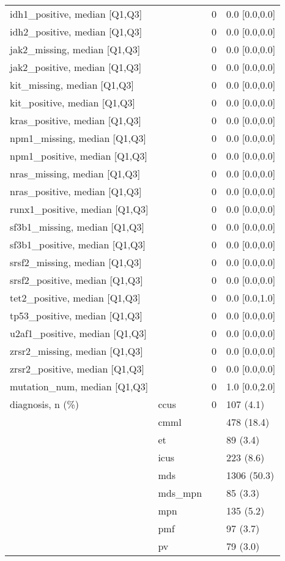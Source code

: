 \begin{tabular}{llll}
idh1\_positive, median [Q1,Q3] &    &      0 &     0.0 [0.0,0.0] \\
idh2\_positive, median [Q1,Q3] &    &      0 &     0.0 [0.0,0.0] \\
jak2\_missing, median [Q1,Q3] &    &      0 &     0.0 [0.0,0.0] \\
jak2\_positive, median [Q1,Q3] &    &      0 &     0.0 [0.0,0.0] \\
kit\_missing, median [Q1,Q3] &    &      0 &     0.0 [0.0,0.0] \\
kit\_positive, median [Q1,Q3] &    &      0 &     0.0 [0.0,0.0] \\
kras\_positive, median [Q1,Q3] &    &      0 &     0.0 [0.0,0.0] \\
npm1\_missing, median [Q1,Q3] &    &      0 &     0.0 [0.0,0.0] \\
npm1\_positive, median [Q1,Q3] &    &      0 &     0.0 [0.0,0.0] \\
nras\_missing, median [Q1,Q3] &    &      0 &     0.0 [0.0,0.0] \\
nras\_positive, median [Q1,Q3] &    &      0 &     0.0 [0.0,0.0] \\
runx1\_positive, median [Q1,Q3] &    &      0 &     0.0 [0.0,0.0] \\
sf3b1\_missing, median [Q1,Q3] &    &      0 &     0.0 [0.0,0.0] \\
sf3b1\_positive, median [Q1,Q3] &    &      0 &     0.0 [0.0,0.0] \\
srsf2\_missing, median [Q1,Q3] &    &      0 &     0.0 [0.0,0.0] \\
srsf2\_positive, median [Q1,Q3] &    &      0 &     0.0 [0.0,0.0] \\
tet2\_positive, median [Q1,Q3] &    &      0 &     0.0 [0.0,1.0] \\
tp53\_positive, median [Q1,Q3] &    &      0 &     0.0 [0.0,0.0] \\
u2af1\_positive, median [Q1,Q3] &    &      0 &     0.0 [0.0,0.0] \\
zrsr2\_missing, median [Q1,Q3] &    &      0 &     0.0 [0.0,0.0] \\
zrsr2\_positive, median [Q1,Q3] &    &      0 &     0.0 [0.0,0.0] \\
mutation\_num, median [Q1,Q3] &    &      0 &     1.0 [0.0,2.0] \\
diagnosis, n (\%) & ccus &      0 &         107 (4.1) \\
                 & cmml &        &        478 (18.4) \\
                 & et &        &          89 (3.4) \\
                 & icus &        &         223 (8.6) \\
                 & mds &        &       1306 (50.3) \\
                 & mds\_mpn &        &          85 (3.3) \\
                 & mpn &        &         135 (5.2) \\
                 & pmf &        &          97 (3.7) \\
                 & pv &        &          79 (3.0) \\
\bottomrule
\end{tabular}
